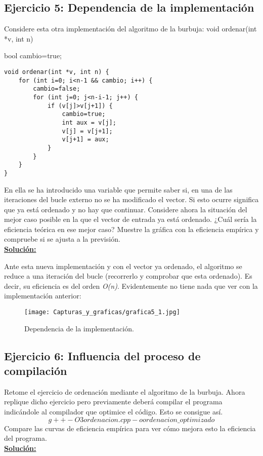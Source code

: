\documentclass[11pt,a4paper]{article}
\begin{document}
\subsection{Ejercicio 5: Dependencia de la implementación}
Considere esta otra implementación del algoritmo de la burbuja:
void ordenar(int *v, int n) {
bool cambio=true;
\begin{lstlisting}
void ordenar(int *v, int n) {
	for (int i=0; i<n-1 && cambio; i++) {
		cambio=false;
		for (int j=0; j<n-i-1; j++) {
			if (v[j]>v[j+1]) {
				cambio=true;
				int aux = v[j];
				v[j] = v[j+1];
				v[j+1] = aux;
			}
		}
	}
}
\end{lstlisting}
En ella se ha introducido una variable que permite saber si, en una de las iteraciones del bucle externo no se ha modificado el vector. Si esto ocurre significa que ya está ordenado y no hay que continuar.
Considere ahora la situación del mejor caso posible en la que el vector de entrada ya está ordenado. ¿Cuál sería la eficiencia teórica en ese mejor caso? Muestre la gráfica con la eficiencia empírica y compruebe si se ajusta a la previsión.\\

\textbf{\underline{Solución:}}

Ante esta nueva implementación y con el vector ya ordenado, el algoritmo se reduce a una iteración del bucle (recorrerlo y comprobar que esta ordenado). Es decir, su eficiencia es del orden \emph{O(n)}. Evidentemente no tiene nada que ver con la implementación anterior:

\begin{figure}[H]
	\centering
	\texttt{[image: Capturas\_y\_graficas/grafica5\_1.jpg]}
	\caption{Dependencia de la implementación.}
\end{figure}

\subsection{Ejercicio 6: Influencia del proceso de compilación}
Retome el ejercicio de ordenación mediante el algoritmo de la burbuja. Ahora replique dicho ejercicio pero previamente deberá compilar el programa indicándole al compilador que optimice el código. Esto se consigue así.
\[ g++ -O3 ordenacion.cpp -o ordenacion\_optimizado\] 
Compare las curvas de eficiencia empírica para ver cómo mejora esto la eficiencia del programa. \\

\textbf{\underline{Solución:}}

}
\end{document}
